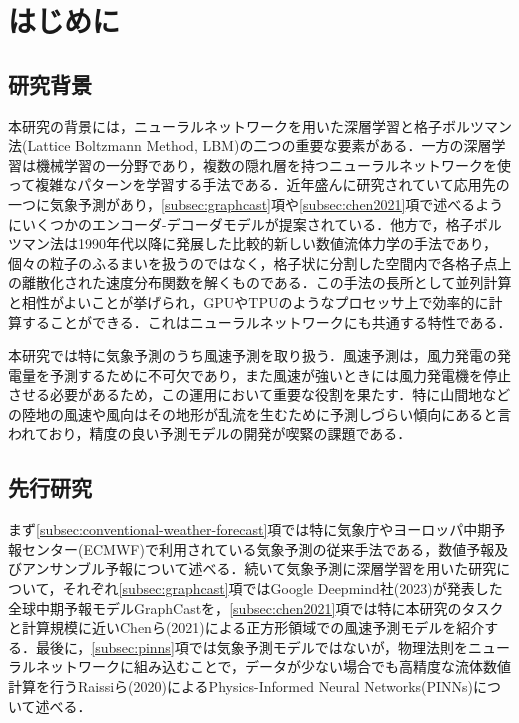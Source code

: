 \chapter{はじめに}

\section{研究背景}
本研究の背景には，ニューラルネットワークを用いた深層学習と格子ボルツマン法(Lattice Boltzmann Method, LBM)の二つの重要な要素がある．一方の深層学習は機械学習の一分野であり，複数の隠れ層を持つニューラルネットワークを使って複雑なパターンを学習する手法である\cite{doi:10.1126/science.1127647}．近年盛んに研究されていて応用先の一つに気象予測があり\cite{Schultz2021}，\ref{subsec:graphcast}項や\ref{subsec:chen2021}項で述べるようにいくつかのエンコーダ-デコーダモデルが提案されている．他方で，格子ボルツマン法は1990年代以降に発展した比較的新しい数値流体力学の手法であり，個々の粒子のふるまいを扱うのではなく，格子状に分割した空間内で各格子点上の離散化された速度分布関数を解くものである\cite{doi:10.1146/annurev.fluid.30.1.329}．この手法の長所として並列計算と相性がよいことが挙げられ，GPUやTPUのようなプロセッサ上で効率的に計算することができる\cite{Satofuka1999}．これはニューラルネットワークにも共通する特性である\cite{OH20041311}．

本研究では特に気象予測のうち風速予測を取り扱う．風速予測は，風力発電の発電量を予測するために不可欠であり，また風速が強いときには風力発電機を停止させる必要があるため，この運用において重要な役割を果たす．特に山間地などの陸地の風速や風向はその地形が乱流を生むために予測しづらい傾向にあると言われており\cite{YAN2022112519}，精度の良い予測モデルの開発が喫緊の課題である．

\section{先行研究 \label{sec:previous-studies}}
まず\ref{subsec:conventional-weather-forecast}項では特に気象庁やヨーロッパ中期予報センター(ECMWF)で利用されている気象予測の従来手法である，数値予報及びアンサンブル予報について述べる．続いて気象予測に深層学習を用いた研究について，それぞれ\ref{subsec:graphcast}項ではGoogle Deepmind社(2023)が発表した全球中期予報モデルGraphCastを，\ref{subsec:chen2021}項では特に本研究のタスクと計算規模に近いChenら(2021)による正方形領域での風速予測モデルを紹介する．最後に，\ref{subsec:pinns}項では気象予測モデルではないが，物理法則をニューラルネットワークに組み込むことで，データが少ない場合でも高精度な流体数値計算を行うRaissiら(2020)によるPhysics-Informed Neural Networks(PINNs)について述べる．


